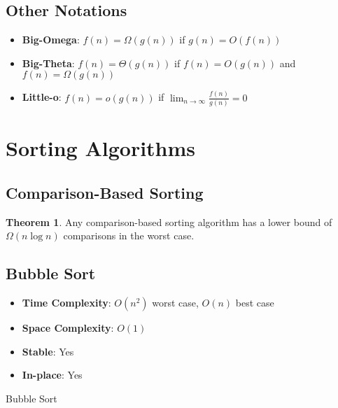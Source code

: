 \documentclass[11pt]{article}
\theoremstyle{definition}
\newtheorem{theorem}{Theorem}[section]
\begin{document}
\subsection{Other Notations}
\begin{itemize}
    \item \textbf{Big-Omega}: $f(n) = \Omega(g(n))$ if $g(n) = O(f(n))$
    \item \textbf{Big-Theta}: $f(n) = \Theta(g(n))$ if $f(n) = O(g(n))$ and $f(n) = \Omega(g(n))$
    \item \textbf{Little-o}: $f(n) = o(g(n))$ if $\lim_{n \to \infty} \frac{f(n)}{g(n)} = 0$
\end{itemize}

\section{Sorting Algorithms}

\subsection{Comparison-Based Sorting}
\begin{theorem}
Any comparison-based sorting algorithm has a lower bound of $\Omega(n \log n)$ comparisons in the worst case.
\end{theorem}

\subsection{Bubble Sort}
\begin{itemize}
    \item \textbf{Time Complexity}: $O(n^2)$ worst case, $O(n)$ best case
    \item \textbf{Space Complexity}: $O(1)$
    \item \textbf{Stable}: Yes
    \item \textbf{In-place}: Yes
\end{itemize}

\begin{algorithm}
\caption{Bubble Sort}
\begin{algorithmic}[1]
                \State {}
            \EndIf
        \EndFor
    \EndFor
\EndProcedure
\end{algorithmic}
\end{algorithm}
\end{document}
